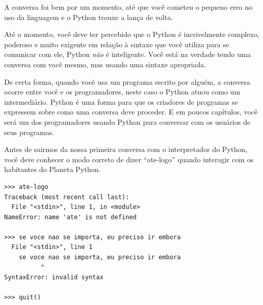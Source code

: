 A conversa foi bem por um momento, até que você cometeu o
pequeno erro no uso da linguagem e o Python trouxe a lança
de volta.
%

Até o momento, você deve ter percebido que o Python
é incrivelmente complexo, poderoso e muito exigente em relação
à sintaxe que você utiliza para se comunicar com ele, Python {\em não}
é inteligente. Você está na verdade tendo uma conversa com você mesmo,
mas usando uma sintaxe apropriada.
%

De certa forma, quando você usa um programa escrito por alguém,
a conversa ocorre entre você e os programadores, neste caso o Python
atuou como um intermediário. Python é uma forma para que os criadores de
programas se expressem sobre como uma conversa deve proceder. E em poucos
capítulos, você será um dos programadores usando Python para conversar com
os usuários de seus programas.
%

Antes de sairmos da nossa primeira conversa com o interpretador
do Python, você deve conhecer o modo correto de dizer ``ate-logo''
quando interagir com os habitantes do Planeta Python.
%

\beforeverb
\begin{verbatim}
>>> ate-logo
Traceback (most recent call last):
  File "<stdin>", line 1, in <module>
NameError: name 'ate' is not defined

>>> se voce nao se importa, eu preciso ir embora
  File "<stdin>", line 1
    se voce nao se importa, eu preciso ir embora
          ^
SyntaxError: invalid syntax

>>> quit()
\end{verbatim}
\afterverb
%

